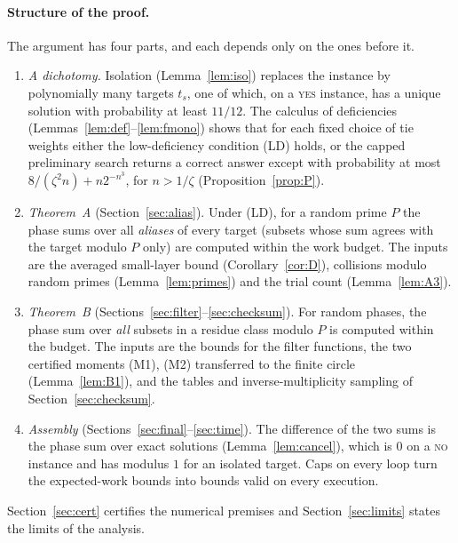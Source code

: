 \documentclass[11pt]{article}
\theoremstyle{definition}
\begin{document}
\paragraph{Structure of the proof.} The argument has four parts, and each depends only on the ones before it.
\begin{enumerate}[label=\textup{(\roman*)}]
\item \emph{A dichotomy.} Isolation (Lemma~\ref{lem:iso}) replaces the instance by polynomially many targets $t_s$,
one of which, on a \textsc{yes} instance, has a unique solution with probability at least $11/12$. The calculus of
deficiencies (Lemmas~\ref{lem:def}--\ref{lem:fmono}) shows that for each fixed choice of tie weights either the
low-deficiency condition \textup{(LD)} holds, or the capped preliminary search returns a correct answer except with
probability at most $8/(\zeta^2n)+n2^{-n^3}$, for $n>1/\zeta$ (Proposition~\ref{prop:P}).
\item \emph{Theorem~A} (Section~\ref{sec:alias}). Under \textup{(LD)}, for a random prime $P$ the phase sums over all
\emph{aliases} of every target (subsets whose sum agrees with the target modulo $P$ only) are computed within the
work budget. The inputs are the averaged small-layer bound (Corollary~\ref{cor:D}), collisions modulo random primes
(Lemma~\ref{lem:primes}) and the trial count (Lemma~\ref{lem:A3}).
\item \emph{Theorem~B} (Sections~\ref{sec:filter}--\ref{sec:checksum}). For random phases, the phase sum over
\emph{all} subsets in a residue class modulo $P$ is computed within the budget. The inputs are the bounds for the
filter functions, the two certified moments \textup{(M1)}, \textup{(M2)} transferred to the finite circle
(Lemma~\ref{lem:B1}), and the tables and inverse-multiplicity sampling of Section~\ref{sec:checksum}.
\item \emph{Assembly} (Sections~\ref{sec:final}--\ref{sec:time}). The difference of the two sums is the phase sum
over exact solutions (Lemma~\ref{lem:cancel}), which is $0$ on a \textsc{no} instance and has modulus $1$ for an
isolated target. Caps on every loop turn the expected-work bounds into bounds valid on every execution.
\end{enumerate}
Section~\ref{sec:cert} certifies the numerical premises and Section~\ref{sec:limits} states the limits of the
analysis.
\end{document}
